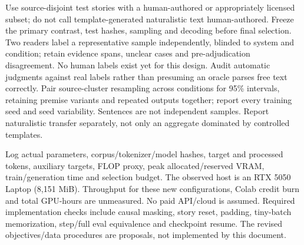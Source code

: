 Use source-disjoint test stories with a human-authored or appropriately licensed
subset; do not call template-generated naturalistic text human-authored. Freeze
the primary contrast, test hashes, sampling and decoding before final selection.
Two readers label a representative sample independently, blinded to system and
condition; retain evidence spans, unclear cases and pre-adjudication disagreement.
No human labels exist yet for this design. Audit automatic judgments against
real labels rather than presuming an oracle parses free text correctly.
Pair source-cluster resampling across conditions for 95\% intervals, retaining
premise variants and repeated outputs together; report every training seed and
seed variability. Sentences are not independent samples. Report naturalistic
transfer separately, not only an aggregate dominated by controlled templates.

Log actual parameters, corpus/tokenizer/model hashes, target and processed tokens,
auxiliary targets, FLOP proxy, peak allocated/reserved VRAM, train/generation time
and selection budget. The observed host is an RTX 5050 Laptop (8,151 MiB).
Throughput for these new configurations, Colab credit burn and total GPU-hours
are unmeasured. No paid API/cloud is assumed. Required implementation checks
include causal masking, story reset, padding, tiny-batch memorization, step/full
eval equivalence and checkpoint resume. The revised objectives/data procedures
are proposals, not implemented by this document.
